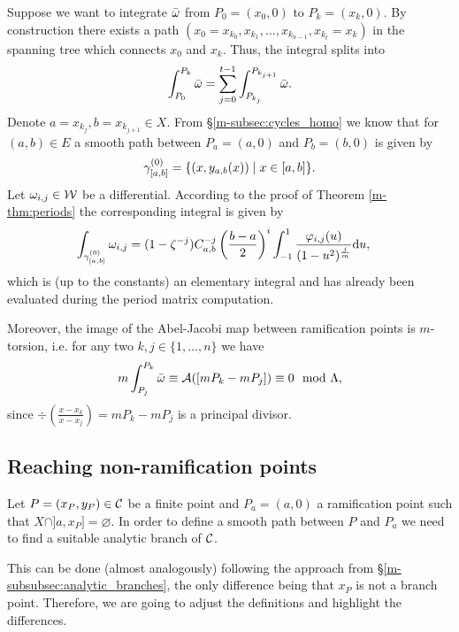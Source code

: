 \documentclass[main.tex]{subfiles}
\begin{document}
  Suppose we want to integrate $\bar{\omega}$ from $P_0 =(x_0,0)$ to $P_k = (x_k,0)$. By construction there exists a path
 $(x_0=x_{k_0},x_{k_1},\dots,x_{k_{n-1}},x_{k_t}=x_k)$ in the spanning tree which connects $x_0$ and $x_k$. Thus, the integral splits into
  \begin{align*}
    \int_{P_0}^{P_k} \bar{\omega} = \sum_{j = 0}^{t-1}  \int_{P_{k_j}}^{P_{k_{j+1}}} \bar{\omega}.
  \end{align*}
  Denote $a = x_{k_j}, b = x_{k_{j+1}} \in X$. From \S \ref{m-subsec:cycles_homo} we know that for $(a,b) \in E$ a smooth path between $P_a=(a,0)$ and $P_b=(b,0)$ is given by
  \begin{align*}
   \gamma_{[a,b]}^{(0)} = \{  (x,y_{a,b}(x))  \mid  x \in [a,b]  \}.
  \end{align*}
  Let $\omega_{i,j} \in \mathcal{W}$ be a differential. According to the proof of Theorem \ref{m-thm:periods} the corresponding integral is given by
  \begin{align*}
   \int_{\gamma_{[a,b]}^{(0)}} \omega_{i,j}  & = 
   (1-\zeta^{-j}) C_{a,b}^{-j} \left(\frac{b-a}{2}\right)^i \int_{-1}^1 \frac{\varphi_{i,j}(u)}{(1-u^2)^{\frac{j}{m}}}  \mathrm d u,
  \end{align*}
  which is  (up to the constants) an elementary integral and has already been evaluated during the period matrix computation.
  
  Moreover, the image of the Abel-Jacobi map between ramification points is $m$-torsion, i.e. for any two $k,j \in \{1,\dots,n\}$ we have
  \begin{equation}\label{eq:m_tors}
    m \int_{P_j}^{P_k} \bar{\omega} \equiv \mathcal{A}( [ mP_k - mP_j ] ) \equiv 0 \mod  \Lambda,
  \end{equation}
  since $\div\left( \frac{x-x_k}{x-x_j} \right) = mP_k - mP_j$ is a principal divisor.

  \subsection{Reaching non-ramification points}\label{subsec:ajm_finite}

  Let $P = (x_P,y_P) \in \mathcal{C}$ be a finite point and $P_a = (a,0)$ a ramification point such that $X\cap]a,x_P]=\varnothing$. In order to define a smooth path between $P$ and $P_a$ 
  we need to find a suitable analytic branch of $\mathcal{C}$. 
  
  This can be done (almost analogously) following  the approach from \S \ref{m-subsubsec:analytic_branches}, the only difference being that
  $x_P$ is not a branch point. Therefore, we are going to adjust the definitions and highlight the differences.
  
\end{document}
